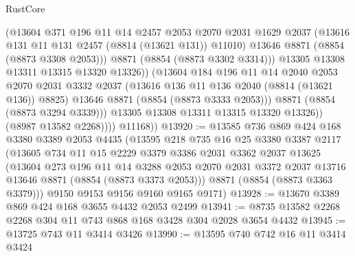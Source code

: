 \begin{lexlean}{RustCore}
\begin{coremodule}
                          (@13604
                            @371
                            @196
                            @11
                            @14
                            @2457
                            @2053
                            @2070
                            @2031
                            @1629
                            @2037
                            (@13616 @131 @11 @131 @2457 (@8814 (@13621 @131)) @11010)
                            @13646
                            @8871
                            (@8854 (@8873 @3308 @2053)))
                          @8871
                          (@8854 (@8873 @3302 @3314)))
                        @13305
                        @13308
                        @13311
                        @13315
                        @13320
                        @13326))
                    (@13604
                      @184
                      @196
                      @11
                      @14
                      @2040
                      @2053
                      @2070
                      @2031
                      @3332
                      @2037
                      (@13616 @136 @11 @136 @2040 (@8814 (@13621 @136)) @8825)
                      @13646
                      @8871
                      (@8854 (@8873 @3333 @2053)))
                    @8871
                    (@8854 (@8873 @3294 @3339)))
                  @13305
                  @13308
                  @13311
                  @13315
                  @13320
                  @13326))
              (@8987 @13582 @2268))))
        @11168))
@13920 := @13585
    @736
    @869
    @424
    @168
    @3380
    @3389
    @2053
    @4435
    (@13595
      @218
      @735
      @16
      @25
      @3380
      @3387
      @2117
      (@13605
        @734
        @11
        @15
        @2229
        @3379
        @3386
        @2031
        @3362
        @2037
        @13625
        (@13604
          @273
          @196
          @11
          @14
          @3288
          @2053
          @2070
          @2031
          @3372
          @2037
          @13716
          @13646
          @8871
          (@8854 (@8873 @3373 @2053)))
        @8871
        (@8854 (@8873 @3363 @3379)))
      @9150
      @9153
      @9156
      @9160
      @9165
      @9171)
@13928 := @13670 @3389 @869 @424 @168 @3655 @4432 @2053 @2499
@13941 := @8735 @13582 @2268 @2268 @304 @11 @743 @868 @168 @3428 @304 @2028 @3654 @4432
@13945 := @13725 @743 @11 @3414 @3426
@13990 := @13595
    @740
    @742
    @16
    @11
    @3414
    @3424

\end{coremodule}
\end{lexlean}
